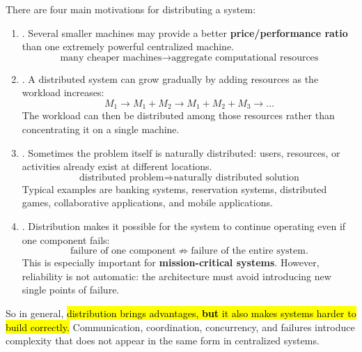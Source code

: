 \highspace
\begin{takeawaysbox}
    There are four main motivations for distributing a system:
    \begin{enumerate}
        \item {}. Several smaller machines may provide a
            better \textbf{price/performance ratio} than one extremely powerful
            centralized machine.
            \begin{equation*}
                \text{many cheaper machines}
                \longrightarrow
                \text{aggregate computational resources}
            \end{equation*}

        \item {}.
            A distributed system can grow gradually by adding resources as the
            workload increases:
            \begin{equation*}
                M_1
                \rightarrow
                M_1 + M_2
                \rightarrow
                M_1 + M_2 + M_3
                \rightarrow \dots
            \end{equation*}
            The workload can then be distributed among those resources rather
            than concentrating it on a single machine.

        \item {}. Sometimes the problem itself
            is naturally distributed: users, resources, or activities already
            exist at different locations.
            \begin{equation*}
                \text{distributed problem}
                \Longrightarrow
                \text{naturally distributed solution}
            \end{equation*}
            Typical examples are banking systems, reservation systems,
            distributed games, collaborative applications, and mobile
            applications.

        \item {}. Distribution makes it possible for the
            system to continue operating even if one component fails:
            \begin{equation*}
                \text{failure of one component}
                \not\Rightarrow
                \text{failure of the entire system}.
            \end{equation*}
            This is especially important for \textbf{mission-critical systems}.
            However, reliability is not automatic: the architecture must avoid
            introducing new single points of failure.

    \end{enumerate}
    So in general, \hl{distribution brings advantages, \textbf{but} it also makes systems harder to build correctly.}
    Communication, coordination, concurrency, and failures introduce
    complexity that does not appear in the same form in centralized systems.
\end{takeawaysbox}